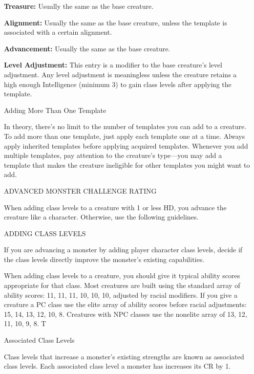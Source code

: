 \documentclass{article}
\begin{document}
\textbf{Treasure: }Usually the same as the base creature.

\textbf{Alignment:} Usually the same as the base creature, unless the template 
is associated with a certain alignment.

\textbf{Advancement:} Usually the same as the base creature.

\textbf{Level Adjustment:} This entry is a modifier to the base creature's level 
adjustment. Any level adjustment is meaningless unless the creature retains a high 
enough Intelligence (minimum 3) to gain class levels after applying the template.

\vspace{12pt}
Adding More Than One Template

In theory, there's no limit to the number of templates you can add to a creature. 
To add more than one template, just apply each template one at a time. Always apply 
inherited templates before applying acquired templates. Whenever you add multiple 
templates, pay attention to the creature's type---you may add a template that makes 
the creature ineligible for other templates you might want to add.

\vspace{12pt}
{\LARGE{}ADVANCED MONSTER CHALLENGE RATING}

When adding class levels to a creature with 1 or less HD, you advance the creature 
like a character. Otherwise, use the following guidelines.

\vspace{12pt}
ADDING CLASS LEVELS

If you are advancing a monster by adding player character class levels, decide 
if the class levels directly improve the monster's existing capabilities.

When adding class levels to a creature, you should give it typical ability scores 
appropriate for that class. Most creatures are built using the standard array of 
ability scores: 11, 11, 11, 10, 10, 10, adjusted by racial modifiers. If you give 
a creature a PC class use the elite array of ability scores before racial adjustments: 
15, 14, 13, 12, 10, 8. Creatures with NPC classes use the nonelite array of 13, 
12, 11, 10, 9, 8. T

\vspace{12pt}
Associated Class Levels

Class levels that increase a monster's existing strengths are known as associated 
class levels. Each associated class level a monster has increases its CR by 1.
\end{document}
